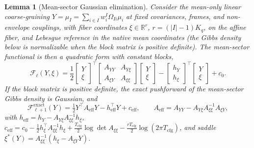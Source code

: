 \documentclass[11pt]{article}
\newtheorem{lemma}{Lemma}
\begin{document}
\begin{lemma}[Mean-sector Gaussian elimination]
\label{thm:rg_exact_closure}
Consider the mean-only linear coarse-graining $Y=\mu_I=\sum_{i\in I}w_i^I\Omega_{Ii}\mu_i$ at fixed covariances, frames, and non-envelope couplings, with fiber coordinates $\xi\in\mathbb{R}^r$, $r=(|I|-1)K_q$, on the affine fiber, and Lebesgue reference in the native mean coordinates (the Gibbs density below is normalizable when the block matrix is positive definite). The mean-sector functional is then a quadratic form with constant blocks,
\begin{equation}
\mathcal{F}_\ell(Y,\xi)
=\frac12
\begin{bmatrix}Y\\ \xi\end{bmatrix}^{\top}
\begin{bmatrix}A_{YY}&A_{Y\xi}\\ A_{\xi Y}&A_{\xi\xi}\end{bmatrix}
\begin{bmatrix}Y\\ \xi\end{bmatrix}
-\begin{bmatrix}h_Y\\ h_\xi\end{bmatrix}^{\top}\begin{bmatrix}Y\\ \xi\end{bmatrix}+c_0 .
\end{equation}
If the block matrix is positive definite, the exact pushforward of the mean-sector Gibbs density is Gaussian, and
\begin{equation}
\mathcal{F}^{\mathrm{exact}}_{\ell+1}(Y)=\tfrac12Y^\top A_{\mathrm{eff}}Y-h_{\mathrm{eff}}^\top Y+c_{\mathrm{eff}},
\qquad
A_{\mathrm{eff}}=A_{YY}-A_{Y\xi}A_{\xi\xi}^{-1}A_{\xi Y},
\label{eq:rg_app_schur_complement}
\end{equation}
with $h_{\mathrm{eff}}=h_Y-A_{Y\xi}A_{\xi\xi}^{-1}h_\xi$, $c_{\mathrm{eff}}=c_0-\tfrac12h_\xi^\top A_{\xi\xi}^{-1}h_\xi+\tfrac{T_{\mathrm{cfg}}}{2}\log\det A_{\xi\xi}-\tfrac{rT_{\mathrm{cfg}}}{2}\log(2\pi T_{\mathrm{cfg}})$, and saddle $\xi^*(Y)=A_{\xi\xi}^{-1}(h_\xi-A_{\xi Y}Y)$.
\end{lemma}
\end{document}

